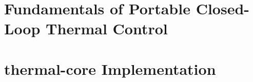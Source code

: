 \documentclass[11pt,a4paper]{article}
\begin{document}
\clearpage

\tableofcontents

\clearpage

\part{Fundamentals of Portable Closed-Loop Thermal Control}









\clearpage

\part{thermal-core Implementation}











\clearpage


\end{document}
